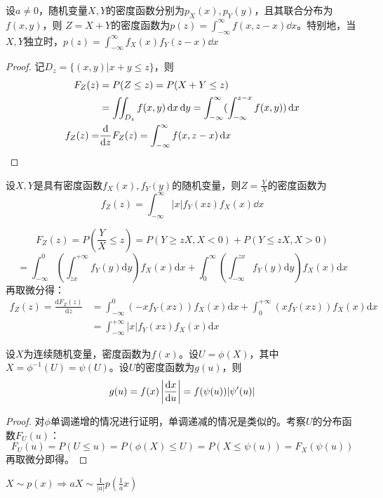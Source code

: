 \documentclass[UTF-8]{ctexbeamer}
\begin{document}
\begin{frame}
  \begin{Lemma}
    设$a\neq 0$，随机变量$X,Y$的密度函数分别为$p_{X}(x),p_{Y}(y)$，且其联合分布为$f(x,y)$，则
    $Z=X+Y$的密度函数为$p(z)=\int_{-\infty}^{\infty}f(x,z-x)\dd x$。特别地，当$X,Y$独立时，$p(z)=\int_{-\infty}^{\infty}f_{X}(x)f_{Y}(z-x)\dd x$
      \end{Lemma}
      
  \begin{proof}
  记$D_{z}=\{(x,y)|x+y\leq z\}$，则
  \begin{align*}
    F_{Z}(z)&=P(Z\leq z)=P(X+Y\leq z)\\
            &=\iint_{D_{z}}f(x,y)\,\mathrm{d} x\,\mathrm{d} y=\int_{-\infty}^{\infty}(\int_{-\infty}^{z-x}f(x,y))\,\mathrm{d} x\\
    f_{Z}(z)=&\frac{\mathrm{d} }{\mathrm{d} z}F_{Z}(z)=\int_{-\infty}^{\infty}f(x,z-x)\,\mathrm{d} x
  \end{align*}
  \end{proof}
\end{frame}


\begin{frame}
  \begin{Lemma}[随机变量之商的密度函数]
    设$X,Y$是具有密度函数$f_{X}(x),f_{Y}(y)$的随机变量，则$Z=\frac{Y}{X}$的密度函数为
    \[f_{Z}(z)=\int_{-\infty}^{\infty}|x|f_{Y}(xz)f_{X}(x)\dd x\]
  \end{Lemma}
    $$
F_{Z}(z)=P\left(\frac{Y}{X} \leq z\right)=P(Y \geq z X, X<0)+P(Y \leq z X, X>0)
$$
$$
=\int_{-\infty}^{0}\left(\int_{z x}^{+\infty} f_{Y}(y) \mathrm{d} y\right) f_{X}(x) \mathrm{d} x+\int_{0}^{\infty}\left(\int_{-\infty}^{z x} f_{Y}(y) \mathrm{d} y\right) f_{X}(x) \mathrm{d} x
$$
再取微分得：
$$
\begin{aligned}
f_{Z}(z)=\frac{\mathrm{d} F_{Z}(z)}{\mathrm{d} z} &=\int_{-\infty}^{0}\left(-x f_{Y}(x z)\right) f_{X}(x) \mathrm{d} x+\int_{0}^{+\infty}\left(x f_{Y}(x z)\right) f_{X}(x) \mathrm{d} x \\
&=\int_{-\infty}^{+\infty}|x| f_{Y}(x z) f_{X}(x) \mathrm{d} x
\end{aligned}
$$
\end{frame}

\begin{frame}
  \begin{Thm}
    设$X$为连续随机变量，密度函数为$f(x)$。设$U=\phi(X)$，其中$X=\phi^{-1}(U)=\psi(U)$。设$U$的密度函数为$g(u)$，则
    \[g(u)=f(x)\left|\frac{\mathrm{d} x}{\mathrm{d} u}\right|=f(\psi(u))|\psi'(u)|\]
  \end{Thm}
  \begin{proof}
    对$\phi$单调递增的情况进行证明，单调递减的情况是类似的。考察$U$的分布函数$F_{U}(u)$：
    \[F_{U}(u)=P(U\leq u)=P(\phi(X)\leq U)=P(X\leq \psi(u))=F_{X}(\psi(u))\]
    再取微分即得。
  \end{proof}
  $X\sim p(x)\Rightarrow aX\sim \frac{1}{|a|}p(\frac{1}{a}x)$
\end{frame}
\end{document}
